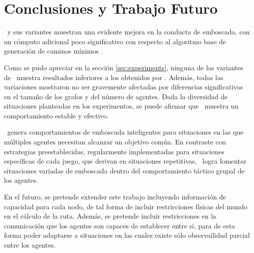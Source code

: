 \section{Conclusiones y Trabajo Futuro}
\label{sec:conclusions}

\ambush\ y sus variantes muestran una evidente mejora en la conducta de
emboscada, con un c\'omputo adicional poco significativo con respecto
al algoritmo base de generaci\'on de caminos m\'inimos \astar.

Como se pudo apreciar en la secci\'on \ref{sec:experiments}, ninguna
de las variantes de \ambush\ muestra resultados inferiores a los obtenidos
por \astar. Adem\'as, todas las variaciones mostraron no ser gravemente
afectadas por diferencias significativas en el tamaño de los grafos y
del n\'umero de agentes. Dada la diversidad de situaciones planteadas
en los experimentos, se puede afirmar que \ambush\ muestra un comportamiento
estable y efectivo.

\ambush\ genera comportamientos de emboscada inteligentes para situaciones
en las que múltiples agentes necesitan alcanzar un objetivo común. En
contraste con estrategias preestablecidas, regularmente implementadas para
situaciones específicas de cada juego, que derivan en situaciones repetitivas,
\ambush\ logra fomentar situaciones va\-ria\-das de emboscada dentro del 
comportamiento táctico grupal de los agentes.

En el futuro, se pretende extender este trabajo incluyendo informaci\'on
de capacidad para cada nodo, de tal forma de incluir restricciones
f\'isicas del mundo en el c\'alculo de la ruta. Adem\'as, se pretende
incluir restricciones en la comunicaci\'on que los agentes son capaces
de establecer entre si, para de esta forma poder adaptarse a situaciones
en las cuales existe s\'olo observailidad parcial entre los agentes.
